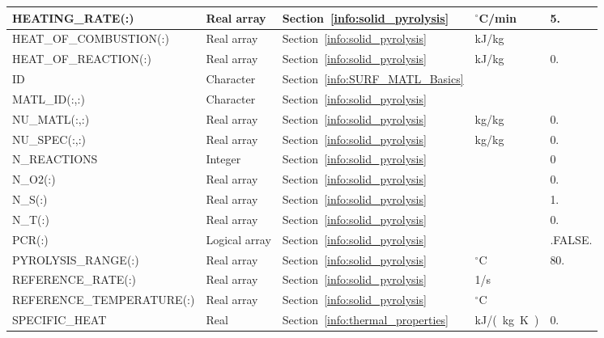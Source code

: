 \documentclass[11pt]{book}
\begin{document}
\begin{longtable}{@{\extracolsep{\fill}}|l|l|l|l|l|}
{\ct HEATING\_RATE(:)}              & Real array    & Section~\ref{info:solid_pyrolysis}    & $^\circ$C/min     & 5.     \\ \hline
{\ct HEAT\_OF\_COMBUSTION(:)}       & Real array    & Section~\ref{info:solid_pyrolysis}    & kJ/kg             &        \\ \hline
{\ct HEAT\_OF\_REACTION(:)}         & Real array    & Section~\ref{info:solid_pyrolysis}    & kJ/kg             & 0.     \\ \hline
{\ct ID     }                       & Character     & Section~\ref{info:SURF_MATL_Basics}   &                   &        \\ \hline
{\ct MATL\_ID(:,:)}                 & Character     & Section~\ref{info:solid_pyrolysis}    &                   &        \\ \hline
{\ct NU\_MATL(:,:)}                 & Real array    & Section~\ref{info:solid_pyrolysis}    & kg/kg             & 0.     \\ \hline
{\ct NU\_SPEC(:,:)}                 & Real array    & Section~\ref{info:solid_pyrolysis}    & kg/kg             & 0.     \\ \hline
{\ct N\_REACTIONS}                  & Integer       & Section~\ref{info:solid_pyrolysis}    &                   & 0      \\ \hline
{\ct N\_O2(:)}                      & Real array    & Section~\ref{info:solid_pyrolysis}    &                   & 0.     \\ \hline
{\ct N\_S(:)}                       & Real array    & Section~\ref{info:solid_pyrolysis}    &                   & 1.     \\ \hline
{\ct N\_T(:)}                       & Real array    & Section~\ref{info:solid_pyrolysis}    &                   & 0.     \\ \hline
{\ct PCR(:)}                        & Logical array & Section~\ref{info:solid_pyrolysis}    &                   & {\ct.FALSE.}\\ \hline
{\ct PYROLYSIS\_RANGE(:)}           & Real array    & Section~\ref{info:solid_pyrolysis}    & $^\circ$C         & 80.    \\ \hline
{\ct REFERENCE\_RATE(:)}            & Real array    & Section~\ref{info:solid_pyrolysis}    & 1/s               &        \\ \hline
{\ct REFERENCE\_TEMPERATURE(:)}     & Real array    & Section~\ref{info:solid_pyrolysis}    & $^\circ$C         &        \\ \hline
{\ct SPECIFIC\_HEAT}                & Real          & Section~\ref{info:thermal_properties} & \si{kJ/(kg.K)}    & 0.     \\ \hline

\end{longtable}
\end{document}

